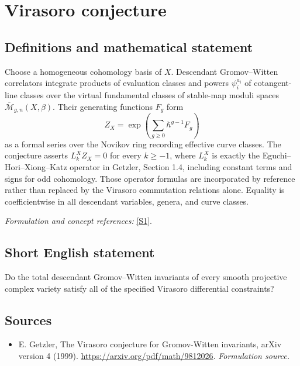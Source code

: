 \documentclass[11pt]{article}
\begin{document}
\section*{\texorpdfstring{Virasoro conjecture}{Virasoro conjecture}}\label{7200020}
\subsection{Definitions and mathematical statement}
Choose a homogeneous cohomology basis of $X$. Descendant Gromov--Witten correlators integrate products of evaluation classes and powers $\psi_i^{a_i}$ of cotangent-line classes over the virtual fundamental classes of stable-map moduli spaces $\overline{\mathcal M}_{g,n}(X,\beta)$. Their generating functions $F_g$ form
\[
 Z_X=\exp\left(\sum_{g\ge0}\hbar^{g-1}F_g\right)
\]
as a formal series over the Novikov ring recording effective curve classes. The conjecture asserts $L_k^XZ_X=0$ for every $k\ge-1$, where $L_k^X$ is exactly the Eguchi--Hori--Xiong--Katz operator in Getzler, Section 1.4, including constant terms and signs for odd cohomology. Those operator formulas are incorporated by reference rather than replaced by the Virasoro commutation relations alone. Equality is coefficientwise in all descendant variables, genera, and curve classes.
\par\smallskip\textit{Formulation and concept references:} \href{https://arxiv.org/pdf/math/9812026}{[S1]}.

\subsection{Short English statement}
Do the total descendant Gromov–Witten invariants of every smooth projective complex variety satisfy all of the specified Virasoro differential constraints?
\subsection{Sources}
\begin{itemize}
\item[S1]E. Getzler, The Virasoro conjecture for Gromov-Witten invariants, arXiv version 4 (1999).
\url{https://arxiv.org/pdf/math/9812026}.
\textit{Formulation source.}
\end{itemize}
\end{document}
